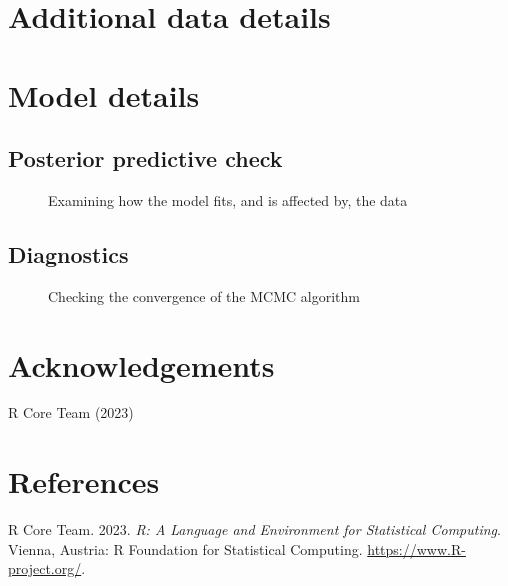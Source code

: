 \documentclass[
  letterpaper,
  DIV=11,
  numbers=noendperiod]{scrartcl}
\newlength{\cslhangindent}
\newenvironment{CSLReferences}[2] %
 {\begin{list}{}{%
  \setlength{\itemindent}{0pt}
  \setlength{\leftmargin}{0pt}
  \setlength{\parsep}{0pt}
  \ifodd #1
   \setlength{\leftmargin}{\cslhangindent}
   \setlength{\itemindent}{-1\cslhangindent}
  \fi
  \setlength{\itemsep}{#2\baselineskip}}}
 {\end{list}}
\begin{document}
\section{Additional data details}\label{additional-data-details}

\section{Model details}\label{sec-model-details}

\subsection{Posterior predictive
check}\label{posterior-predictive-check}

\begin{figure}

\begin{minipage}{0.50\linewidth}
Examining how the model fits, and is affected by, the
data\end{minipage}%

\end{figure}%

\subsection{Diagnostics}\label{diagnostics}

\begin{figure}

\begin{minipage}{0.50\linewidth}
Checking the convergence of the MCMC algorithm\end{minipage}%

\end{figure}%

\newpage

\section{Acknowledgements}\label{acknowledgements}

R Core Team (2023)

\section*{References}\label{references}

\label{refs}
\begin{CSLReferences}{1}{0}
R Core Team. 2023. \emph{{R: A Language and Environment for Statistical
Computing}}. Vienna, Austria: R Foundation for Statistical Computing.
\url{https://www.R-project.org/}.

\end{CSLReferences}
\end{document}
